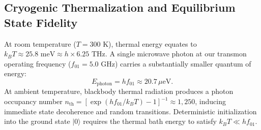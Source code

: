 \documentclass[10pt,journal,compsoc]{IEEEtran}
\begin{document}
\begin{table}[!ht]
\centering
\caption{Physical and Operational Comparison of Leading Quantum Computing Hardware Modalities}
\label{tab:modalities}
\end{table}

\subsection{Cryogenic Thermalization and Equilibrium State Fidelity}
At room temperature ($T = 300\text{ K}$), thermal energy equates to $k_B T \approx 25.8\text{ meV} \approx h \times 6.25\text{ THz}$. A single microwave photon at our transmon operating frequency ($f_{01} = 5.0\text{ GHz}$) carries a substantially smaller quantum of energy:
\begin{equation}
E_{\text{photon}} = h f_{01} \approx 20.7\,\mu\text{eV}.
\end{equation}
At ambient temperature, blackbody thermal radiation produces a photon occupancy number $n_{\text{th}} = [\exp(h f_{01}/k_B T) - 1]^{-1} \approx 1{,}250$, inducing immediate state decoherence and random transitions. Deterministic initialization into the ground state $|0\rangle$ requires the thermal bath energy to satisfy $k_B T \ll h f_{01}$.
\end{document}

